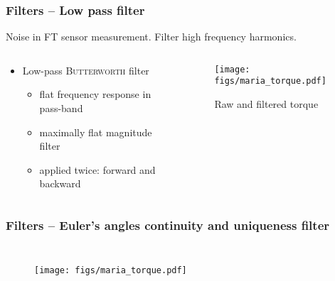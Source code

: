 \documentclass[aspectratio=1610]{beamer}
\begin{document}
\begin{frame}
\frametitle{Filters – Low pass filter}
Noise in FT sensor measurement. Filter high frequency harmonics.
\begin{columns}
\begin{column}{0.5\textwidth}
  \begin{itemize}\itemsep1em
    \justifying
    \item Low-pass \textsc{Butterworth} filter
    \begin{itemize}
      \item flat frequency response in pass-band
      \item maximally flat magnitude filter
      \item applied twice: forward and backward
    \end{itemize}
  \end{itemize}
\end{column}
\begin{column}{0.5\textwidth}  %
  \begin{figure}
    \centering
    \texttt{[image: figs/maria\_torque.pdf]}
    \caption{Raw and filtered torque}
  \end{figure}
\end{column}
\end{columns}

\end{frame}

\begin{frame}
\frametitle{Filters – Euler's angles continuity and uniqueness filter}
\begin{columns}
  \column{37em}
  \begin{figure}
    \centering
    \texttt{[image: figs/maria\_torque.pdf]}
  \end{figure}
\end{columns}
\end{frame}
\end{document}
